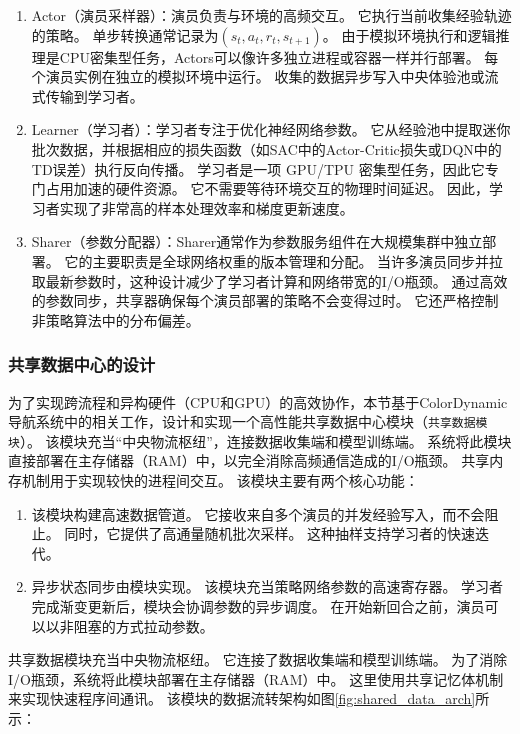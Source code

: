 \begin{enumerate}
\item Actor（演员采样器）：演员负责与环境的高频交互。 它执行当前收集经验轨迹的策略。 单步转换通常记录为$(s_t, a_t, r_t, s_{t+1})$。 由于模拟环境执行和逻辑推理是CPU密集型任务，Actors可以像许多独立进程或容器一样并行部署。 每个演员实例在独立的模拟环境中运行。 收集的数据异步写入中央体验池或流式传输到学习者。

\item Learner（学习者）：学习者专注于优化神经网络参数。 它从经验池中提取迷你批次数据，并根据相应的损失函数（如SAC中的Actor-Critic损失或DQN中的TD误差）执行反向传播。 学习者是一项 GPU/TPU 密集型任务，因此它专门占用加速的硬件资源。 它不需要等待环境交互的物理时间延迟。 因此，学习者实现了非常高的样本处理效率和梯度更新速度。

\item Sharer（参数分配器）：Sharer通常作为参数服务组件在大规模集群中独立部署。 它的主要职责是全球网络权重的版本管理和分配。 当许多演员同步并拉取最新参数时，这种设计减少了学习者计算和网络带宽的I/O瓶颈。 通过高效的参数同步，共享器确保每个演员部署的策略不会变得过时。 它还严格控制非策略算法中的分布偏差。

\end{enumerate}

\subsubsection{共享数据中心的设计}
为了实现跨流程和异构硬件（CPU和GPU）的高效协作，本节基于ColorDynamic导航系统\cite{colordynamic}中的相关工作，设计和实现一个高性能共享数据中心模块（\texttt{共享数据模块}）。 该模块充当“中央物流枢纽”，连接数据收集端和模型训练端。 系统将此模块直接部署在主存储器（RAM）中，以完全消除高频通信造成的I/O瓶颈。 共享内存机制用于实现较快的进程间交互。 该模块主要有两个核心功能：
\begin{enumerate}

\item 该模块构建高速数据管道。 它接收来自多个演员的并发经验写入，而不会阻止。 同时，它提供了高通量随机批次采样。 这种抽样支持学习者的快速迭代。

\item 异步状态同步由模块实现。 该模块充当策略网络参数的高速寄存器。 学习者完成渐变更新后，模块会协调参数的异步调度。 在开始新回合之前，演员可以以非阻塞的方式拉动参数。

\end{enumerate}

共享数据模块充当中央物流枢纽。 它连接了数据收集端和模型训练端。 为了消除I/O瓶颈，系统将此模块部署在主存储器（RAM）中。 这里使用共享记忆体机制来实现快速程序间通讯。 该模块的数据流转架构如图\ref{fig:shared_data_arch}所示：

